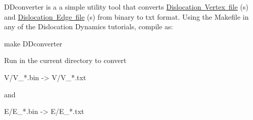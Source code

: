 D\+Dconverter is a a simple utility tool that converts \mbox{\hyperlink{_d_d_vertex}{Dislocation Vertex file}} (s) and \mbox{\hyperlink{_d_d_edge}{Dislocation Edge file}} (s) from binary to txt format. Using the Makefile in any of the Dislocation Dynamics tutorials, compile as\+: \begin{DoxyVerb}make DDconverter
\end{DoxyVerb}


Run in the current directory to convert \begin{DoxyVerb}V/V_*.bin -> V/V_*.txt
\end{DoxyVerb}
 and \begin{DoxyVerb}E/E_*.bin -> E/E_*.txt
\end{DoxyVerb}
 